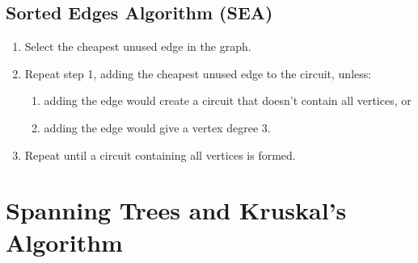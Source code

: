\subsection{Sorted Edges Algorithm (SEA)}%
\label{sub:sorted-edges}

\begin{algorithm}
  \begin{enumerate}
  \item Select the cheapest unused edge in the graph.
  \item Repeat step 1, adding the cheapest unused edge to the circuit,
    unless:
    \begin{enumerate}
    \item adding the edge would create a circuit that doesn't contain
      all vertices, or
    \item adding the edge would give a vertex degree 3.
    \end{enumerate}
  \item Repeat until a circuit containing all vertices is formed.
  \end{enumerate}
\end{algorithm}

\section{Spanning Trees and Kruskal's Algorithm}%
\label{sec:spanning-trees}



